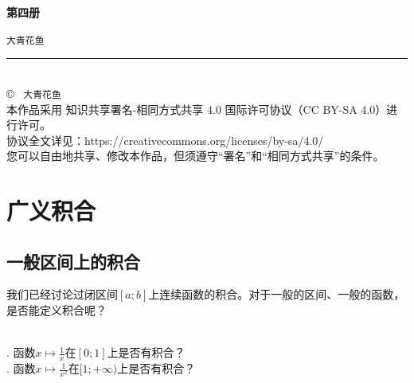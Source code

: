 \documentclass[12pt,UTF8,fontset=none]{ctexbook}
\newcommand{\mytitle}{第四册}
\newcommand{\myauthor}{大青花鱼}
\begin{document}
\cleardoublepage                %
\thispagestyle{empty}           %
\begin{center}
    \vspace*{2cm}               %
    
    { \bfseries \mytitle}
    
    \vspace{1cm}              %
    
    { \texttt{\myauthor}}
    
    \vfill                      %
    
    \rule{0.5\textwidth}{0.4pt} \\[0.5cm]
    
    {\scriptsize
    \copyright\ \the\year{} \texttt{\myauthor} \\[0.2cm]
    本作品采用 知识共享署名-相同方式共享 4.0 国际许可协议（CC BY-SA 4.0）进行许可。\\
    协议全文详见：https://creativecommons.org/licenses/by-sa/4.0/ \\
    您可以自由地共享、修改本作品，但须遵守“署名”和“相同方式共享”的条件。
    }
\end{center}
\newpage   
\tableofcontents
\newpage

\chapter{广义积合}

\section{一般区间上的积合}

我们已经讨论过闭区间$[a;b]$上连续函数的积合。对于一般的区间、一般的函数，是否能定义积合呢？

\begin{ex}
    \mbox{} \\
    . 函数$x\mapsto\frac{1}{x}$在$[0;1]$上是否有积合？\\
    . 函数$x\mapsto\frac{1}{x^2}$在$[1;+\infty)$上是否有积合？
\end{ex}
\end{document}
